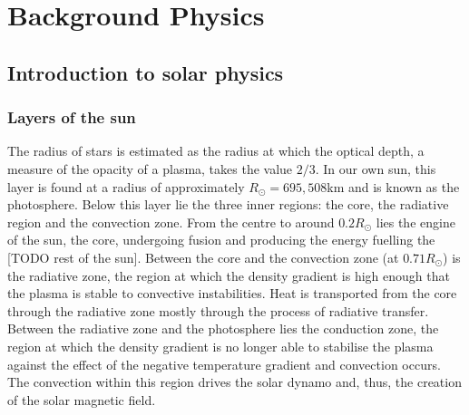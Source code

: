 \chapter{Background Physics}

\section{Introduction to solar physics}

\subsection{Layers of the sun}

The radius of stars is estimated as the radius at which the optical depth, a measure of the opacity of a plasma, takes the value $2/3$. In our own sun, this layer is found at a radius of approximately $R_{\odot} = 695,508$km and is known as the photosphere. Below this layer lie the three inner regions: the core, the radiative region and the convection zone. From the centre to around $0.2 R_{\odot}$ lies the engine of the sun, the core, undergoing fusion and producing the energy fuelling the [TODO rest of the sun]. Between the core and the convection zone (at $0.71R_{\odot}$) is the radiative zone, the region at which the density gradient is high enough that the plasma is stable to convective instabilities. Heat is transported from the core through the radiative zone mostly through the process of radiative transfer. Between the radiative zone and the photosphere lies the conduction zone, the region at which the density gradient is no longer able to stabilise the plasma against the effect of the negative temperature gradient and convection occurs. The convection within this region drives the solar dynamo and, thus, the creation of the solar magnetic field.

